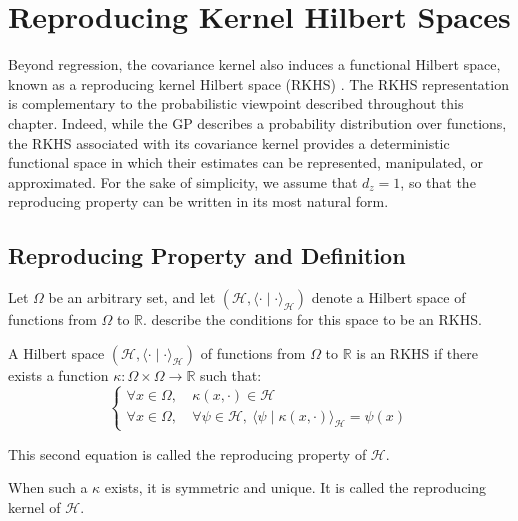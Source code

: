 \section{Reproducing Kernel Hilbert Spaces}\label{sec:RKHS}

Beyond regression, the covariance kernel also induces a functional Hilbert space, known as a reproducing kernel Hilbert space (RKHS) \cite{bib:Aronszajn,bib:RKHS-Dumbgen}. The RKHS representation is complementary to the probabilistic viewpoint described throughout this chapter. Indeed, while the GP describes a probability distribution over functions, the RKHS associated with its covariance kernel provides a deterministic functional space in which their estimates can be represented, manipulated, or approximated. For the sake of simplicity, we assume that $d_z=1$, so that the reproducing property can be written in its most natural form.

\subsection{Reproducing Property and Definition}

Let $\Omega$ be an arbitrary set, and let $(\mathcal{H},\langle\cdot\mid\cdot\rangle_{\mathcal{H}})$ denote a Hilbert space of functions from $\Omega$ to $\mathbb{R}$.  describe the conditions for this space to be an RKHS.

\begin{definition}\label{th:RKHS}
	A Hilbert space $(\mathcal{H},\langle\cdot\mid\cdot\rangle_{\mathcal{H}})$ of functions from $\Omega$ to $\mathbb{R}$ is an RKHS if there exists a function $\kappa:\Omega\times\Omega\to\mathbb{R}$ such that:
	\begin{equation}
		\left\{\begin{aligned}
		\forall x\in\Omega,&\:\kappa(x,\cdot)\in\mathcal{H}\\
		\forall x\in\Omega,&\:\forall \psi\in\mathcal{H},\:\langle \psi\mid \kappa(x,\cdot)\rangle_{\mathcal{H}}=\psi(x)
		\end{aligned}\right.
	\end{equation}

	This second equation is called the reproducing property of $\mathcal{H}$.
\end{definition}

\begin{proposition}\label{th:reproducing_kernel}
	When such a $\kappa$ exists, it is symmetric and unique. It is called the reproducing kernel of $\mathcal{H}$.
\end{proposition}

